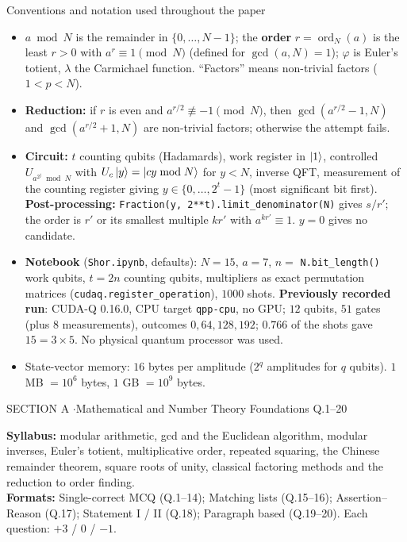 \documentclass[11pt,a4paper]{article}
\begin{document}
\begin{infobox}{Conventions and notation used throughout the paper}
\footnotesize
\begin{itemize}[leftmargin=1.2em, itemsep=1pt, topsep=2pt]
\item $a \bmod N$ is the remainder in $\{0, \dots, N - 1\}$; the \textbf{order} $r = \operatorname{ord}_N(a)$ is the least $r > 0$ with $a^r \equiv 1 \pmod N$ (defined for $\gcd(a, N) = 1$);
      $\varphi$ is Euler's totient, $\lambda$ the Carmichael function. ``Factors'' means non-trivial factors ($1 < p < N$).
\item \textbf{Reduction:} if $r$ is even and $a^{r/2} \not\equiv -1 \pmod N$, then $\gcd(a^{r/2} - 1, N)$ and $\gcd(a^{r/2} + 1, N)$ are non-trivial factors; otherwise the attempt fails.
\item \textbf{Circuit:} $t$ counting qubits (Hadamards), work register in $\ket1$, controlled $U_{a^{2^j} \bmod N}$ with $U_c\ket y = \ket{cy \bmod N}$ for $y < N$, inverse QFT, measurement of the
      counting register giving $y \in \{0, \dots, 2^t - 1\}$ (most significant bit first). \textbf{Post-processing:} \texttt{Fraction(y, 2**t).limit\_denominator(N)} gives $s/r'$;
      the order is $r'$ or its smallest multiple $kr'$ with $a^{kr'} \equiv 1$. $y = 0$ gives no candidate.
\item \textbf{Notebook} (\texttt{Shor.ipynb}, defaults): $N = 15$, $a = 7$, $n = $ \texttt{N.bit\_length()} work qubits, $t = 2n$ counting qubits, multipliers as exact
      permutation matrices (\texttt{cudaq.register\_operation}), $1000$ shots. \textbf{Previously recorded run}: CUDA-Q 0.16.0, CPU target \texttt{qpp-cpu}, no GPU; $12$ qubits,
      $51$ gates (plus $8$ measurements), outcomes $0, 64, 128, 192$; $0.766$ of the shots gave $15 = 3 \times 5$. No physical quantum processor was used.
\item State-vector memory: $16$ bytes per amplitude ($2^q$ amplitudes for $q$ qubits). $1$ MB $= 10^6$ bytes, $1$ GB $= 10^9$ bytes.
\end{itemize}
\end{infobox}
\newpage

\begin{sectionbanner}SECTION A \enspace$\cdot$\enspace Mathematical and Number Theory Foundations \hfill Q.1--20\end{sectionbanner}

{\small \textbf{Syllabus:} modular arithmetic, gcd and the Euclidean algorithm, modular inverses, Euler's totient, multiplicative order, repeated squaring, the Chinese remainder theorem, square roots of unity, classical factoring methods and the reduction to order finding.\\ \textbf{Formats:} Single-correct MCQ (Q.1--14); Matching lists (Q.15--16); Assertion--Reason (Q.17); Statement I / II (Q.18); Paragraph based (Q.19--20). Each question: $+3$ / $0$ / $-1$.}
\par\medskip
\end{document}
